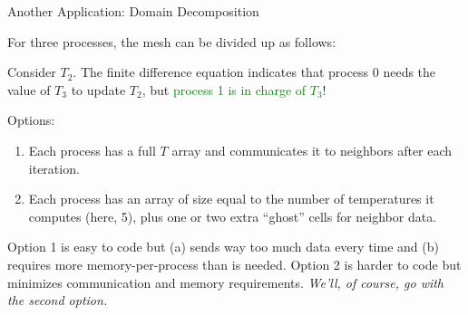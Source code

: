 \documentclass[10pt,handout]{beamer}
\begin{document}
\begin{frame}{Another Application: Domain Decomposition}

For three processes, the mesh can be divided up as follows:

\begin{center}
\end{center}
Consider $T_2$. The finite difference equation 
indicates that process 0 needs the value of $T_3$ to 
update $T_2$, but \textcolor{green}{process 1 is in charge of $T_3$}!  

\vfill 

Options:
\begin{enumerate}
 \item Each process has a full $T$ array and 
       communicates it to neighbors after each iteration.
 \item Each process has an array of size equal to the number of temperatures 
       it computes (here, 5), plus one or two extra ``ghost'' cells for 
       neighbor data.
\end{enumerate}

Option 1 is easy to code but (a) sends way too much data every time and
(b) requires more memory-per-process than is needed.  Option 2 is 
harder to code but minimizes communication and memory requirements. 
{\it We'll, of course, go with the second option.}

\end{frame}
\end{document}
